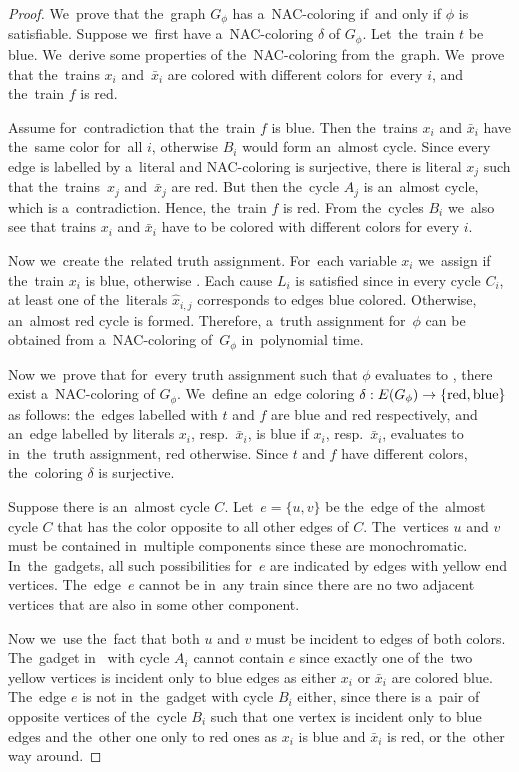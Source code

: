 \begin{proof}
	We~prove that the~graph $G_\phi$ has a~NAC-coloring if~and only if
	$\phi$ is satisfiable.
	Suppose we~first have a~NAC-coloring $\delta$ of $G_\phi$.
	Let~the~train $t$ be blue.
	We~derive some properties of the~NAC-coloring from the~graph.
	We~prove that the~trains $x_i$ and~$\bar{x}_i$
	are colored with different colors for~every $i$,
	and the~train $f$ is red.

	Assume for~contradiction that the~train $f$ is blue.
	Then the~trains $x_i$ and $\bar{x}_i$ have the~same color for~all $i$,
	otherwise $B_i$ would form an~almost cycle.
	Since every edge is labelled by a~literal and NAC-coloring is surjective,
	there is literal $x_j$ such that the~trains~$x_j$ and~$\bar{x}_j$ are red.
	But then the~cycle $A_j$ is an~almost cycle, which is a~contradiction.
	Hence, the~train $f$ is red.
	From the~cycles $B_i$ we~also see
	that trains $x_i$ and $\bar{x}_i$ have to be colored with different colors
	for every $i$.

	Now we~create the~related truth assignment.
	For~each variable $x_i$ we~assign \true{} if
	the~train $x_i$ is blue,
	otherwise \false{}.
	Each cause $L_i$ is satisfied since
	in every cycle $C_i$, at least one of
	the~literals $\hat{x}_{i,j}$ corresponds to edges blue colored.
	Otherwise, an~almost red cycle is formed.
	Therefore, a~truth assignment for~$\phi$ can be obtained
	from a~NAC-coloring of~$G_\phi$ in~polynomial time.

	Now we~prove that for~every truth assignment such that $\phi$ evaluates to \true{}, there exist
	a~NAC-coloring of $G_\phi$. We~define an~edge coloring
	$\delta: E(G_\phi) \to \{\text{red}, \text{blue}\}$ as follows:
	the~edges labelled with $t$ and $f$ are blue and red respectively,
	and an~edge labelled by literals $x_i$, resp.\ $\bar{x}_i$, is blue
	if $x_i$, resp.\ $\bar{x}_i$, evaluates to \true{} in~the~truth assignment, red otherwise.
	Since $t$ and $f$ have different colors,
	the~coloring $\delta$ is surjective.

	Suppose there is an~almost cycle $C$.
	Let~$e=\{u, v\}$ be the~edge of the~almost cycle $C$ that has the color opposite
	to all other edges of $C$.
	The~vertices $u$ and $v$ must be contained in~multiple \trcon{} components
	since these are monochromatic.
	In~the~gadgets, all such possibilities for~$e$ are indicated by edges with yellow end vertices.
	The~edge~$e$ cannot be in~any train since there are no two adjacent vertices that are also
	in some other \trcon{} component.

	Now we~use the~fact that both $u$ and $v$ must be incident to edges of both colors.
	The~gadget in~ with cycle $A_i$
	cannot contain $e$ since exactly one of the~two yellow vertices is incident only to blue edges
	as either $x_i$ or $\bar{x}_i$ are colored blue.
	The~edge $e$ is not in~the~gadget with cycle $B_i$ either,
	since there is a~pair of opposite vertices of the~cycle $B_i$
	such that one vertex is incident only to blue edges and the~other one only to red ones
	as $x_i$ is blue and $\bar{x}_i$ is red, or the~other way around.


\end{proof}
